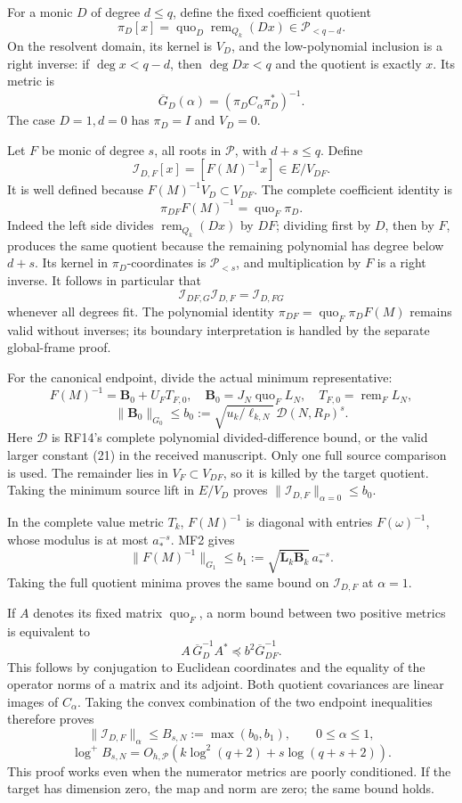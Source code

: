 \documentclass[11pt]{article}
\begin{document}
For a monic \(D\) of degree \(d\le q\), define the fixed coefficient quotient \[
\pi_D[x]=\operatorname{quo}_D\operatorname{rem}_{Q_k}(Dx)
\in\mathcal P_{<q-d}.
\tag{MF17}
\] On the resolvent domain, its kernel is \(V_D\), and the low-polynomial inclusion is a right inverse: if \(\deg x<q-d\), then \(\deg Dx<q\) and the quotient is exactly \(x\). Its metric is \[
\overline G_D(\alpha)=(\pi_DC_\alpha\pi_D^*)^{-1}.
\] The case \(D=1,d=0\) has \(\pi_D=I\) and \(V_D=0\).

Let \(F\) be monic of degree \(s\), all roots in \(\mathscr P\), with \(d+s\le q\). Define \[
\mathcal I_{D,F}[x]=[F(M)^{-1}x]\in E/V_{DF}.
\] It is well defined because \(F(M)^{-1}V_D\subset V_{DF}\). The complete coefficient identity is \[
\boxed{\pi_{DF}F(M)^{-1}=\operatorname{quo}_F\pi_D.}
\tag{MF18}
\] Indeed the left side divides \(\operatorname{rem}_{Q_k}(Dx)\) by \(DF\); dividing first by \(D\), then by \(F\), produces the same quotient because the remaining polynomial has degree below \(d+s\). Its kernel in \(\pi_D\)-coordinates is \(\mathcal P_{<s}\), and multiplication by \(F\) is a right inverse. It follows in particular that \[
\mathcal I_{DF,G}\mathcal I_{D,F}=\mathcal I_{D,FG}
\tag{MF19}
\] whenever all degrees fit. The polynomial identity \(\pi_{DF}=\operatorname{quo}_F\pi_DF(M)\) remains valid without inverses; its boundary interpretation is handled by the separate global-frame proof.

For the canonical endpoint, divide the actual minimum representative: \[
F(M)^{-1}=\mathbf B_0+U_FT_{F,0},\quad
\mathbf B_0=J_N\operatorname{quo}_F L_N,\quad
T_{F,0}=\operatorname{rem}_F L_N,
\] \[
\|\mathbf B_0\|_{G_0}\le
b_0:=\sqrt{u_k/\ell_{k,N}}\,\mathcal D(N,R_P)^s.
\tag{MF20}
\] Here \(\mathcal D\) is RF14's complete polynomial divided-difference bound, or the valid larger constant (21) in the received manuscript. Only one full source comparison is used. The remainder lies in \(V_F\subset V_{DF}\), so it is killed by the target quotient. Taking the minimum source lift in \(E/V_D\) proves \(\|\mathcal I_{D,F}\|_{\alpha=0}\le b_0\).

In the complete value metric \(T_k\), \(F(M)^{-1}\) is diagonal with entries \(F(\omega)^{-1}\), whose modulus is at most \(a_*^{-s}\). MF2 gives \[
\|F(M)^{-1}\|_{G_1}\le
b_1:=\sqrt{\mathbf L_k\mathbf B_k}\,a_*^{-s}.
\tag{MF21}
\] Taking the full quotient minima proves the same bound on \(\mathcal I_{D,F}\) at \(\alpha=1\).

If \(A\) denotes its fixed matrix \(\operatorname{quo}_F\), a norm bound between two positive metrics is equivalent to \[
A\,\overline G_D^{-1}A^*\preceq b^2\overline G_{DF}^{-1}.
\] This follows by conjugation to Euclidean coordinates and the equality of the operator norms of a matrix and its adjoint. Both quotient covariances are linear images of \(C_\alpha\). Taking the convex combination of the two endpoint inequalities therefore proves \[
\boxed{\|\mathcal I_{D,F}\|_\alpha\le
B_{s,N}:=\max(b_0,b_1),\qquad0\le\alpha\le1,}
\] \[
\log^+B_{s,N}
=O_{h,\mathscr P}(k\log^2(q+2)+s\log(q+s+2)).
\tag{MF22}
\] This proof works even when the numerator metrics are poorly conditioned. If the target has dimension zero, the map and norm are zero; the same bound holds.
\end{document}
